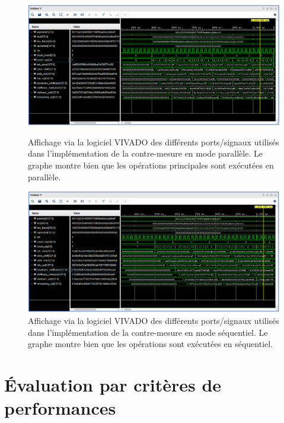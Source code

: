 \documentclass[oneside]{book}
\begin{document}
\begin{figure}[h!]
    \hspace{-1cm}
    \includegraphics[scale=0.53]{image/vivado_parallele}
    \caption{Affichage via la logiciel VIVADO des différents ports/signaux utilisés dans l'implémentation de la contre-mesure en mode parallèle. Le graphe montre bien que les opérations principales sont exécutées en parallèle.}
    \label{fig:signaux_test_autom_parallele} 
    \hspace{-1cm}
    \includegraphics[scale=0.53]{image/vivado_sequentiel}
    \caption{Affichage via la logiciel VIVADO des différents ports/signaux utilisés dans l'implémentation de la contre-mesure en mode séquentiel. Le graphe montre bien que les opérations sont exécutées en séquentiel.}
    \label{fig:signaux_test_autom_sequentiel} 
\end{figure}


\newpage

\section{Évaluation par critères de performances}
\label{sec:EvalPerf}
\end{document}
